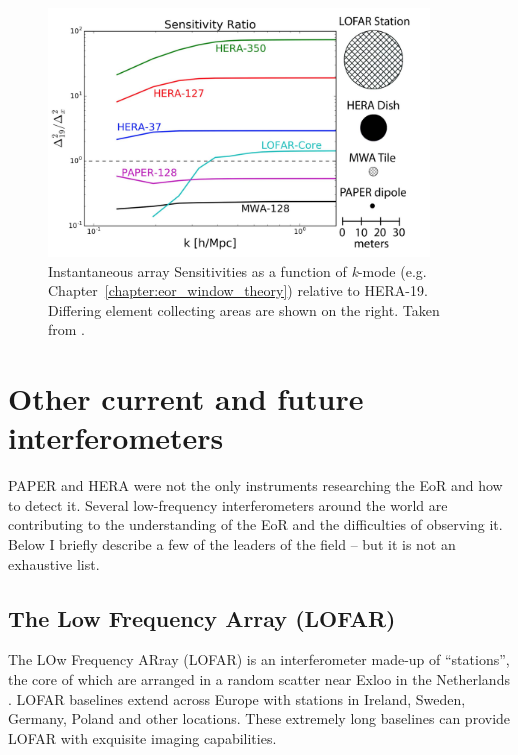 \begin{figure}
\centering
\includegraphics[width=0.9\textwidth]{chapters/instruments/figures/deBoer_sensitivities.png}
\caption[Array sensitivity as a function of \textit{k}-mode relative to HERA-19]{Instantaneous array Sensitivities as a function of \textit{k}-mode (e.g. Chapter~\ref{chapter:eor_window_theory}) relative to HERA-19. Differing element collecting areas are shown on the right. Taken from \cite{deBoer.17}.}
\label{fig:instruments_sensitivity}
\end{figure}

\section{Other current and future interferometers}
\label{sec:not_used_in_this_work}

PAPER and HERA were not the only instruments researching the EoR and how to detect it. Several low-frequency interferometers around the world are contributing to the understanding of the EoR and the difficulties of observing it. Below I briefly describe a few of the leaders of the field -- but it is not an exhaustive list.

\subsection{The Low Frequency Array (LOFAR)}

The LOw Frequency ARray (LOFAR) is an interferometer made-up of ``stations'', the core of which are arranged in a random scatter near Exloo in the Netherlands \citep{vanHaarlem.13}. LOFAR baselines extend across Europe with stations in Ireland, Sweden, Germany, Poland and other locations. These extremely long baselines can provide LOFAR with exquisite imaging capabilities. 


